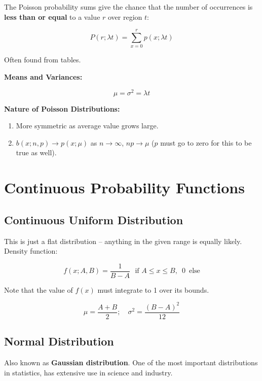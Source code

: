 \documentclass[a4paper,12pt]{report}
\begin{document}
The Poisson probability sums give the chance that the number of occurrences is \textbf{less than or equal} to a value $r$ over region $t$:

$$P(r; \lambda t) = \sum_{x=0}^{r} p(x; \lambda t)$$

Often found from tables.

\textbf{Means and Variances: } 

$$\mu = \sigma^2 = \lambda t$$

\textbf{Nature of Poisson Distributions: }

\begin{enumerate}
\item More symmetric as average value grows large.
\item $b(x; n, p) \to p(x; \mu)$ as $n \to \infty$, $np \to \mu$ ($p$ must go to zero for this to be true as well).
\end{enumerate}


















\chapter{Continuous Probability Functions}

\section{Continuous Uniform Distribution}

This is just a flat distribution -- anything in the given range is equally likely. Density function:

$$f(x; A, B) = \frac{1}{B-A} \,\,\text{ if} \,\,A \leq x \leq B, \,\,\, 0\,\,\, \text{else}$$

Note that the value of $f(x)$ must integrate to 1 over its bounds.

$$\mu = \frac{A+B}{2}; \,\,\,\,\,\, \sigma^2 = \frac{(B-A)^2}{12}$$

\section{Normal Distribution}

Also known as \textbf{Gaussian distribution}. One of the most important distributions in statistics, has extensive use in science and industry. 
\end{document}
